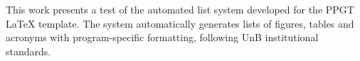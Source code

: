 This work presents a test of the automated list system developed for the PPGT LaTeX template. The system automatically generates lists of figures, tables and acronyms with program-specific formatting, following UnB institutional standards.